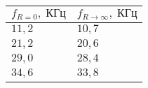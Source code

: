 \begin{tabular}{|l|l|}
\hline
$f_{R=0},\;\text{КГц}$ & $f_{R\to\infty},\;\text{КГц}$\\\hline
$11{,}2$ & $10{,}7$\\\hline
$21{,}2$ & $20{,}6$\\\hline
$29{,}0$ & $28{,}4$\\\hline
$34{,}6$ & $33{,}8$\\\hline
\end{tabular}

